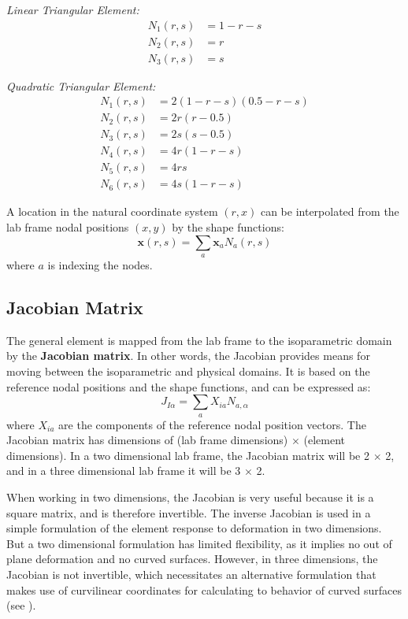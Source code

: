 \documentclass[]{spie}  %
\begin{document}
\textit{Linear Triangular Element:}
\begin{align}
\label{eq: linear element}
N_1(r,s) &=  1 - r - s \nonumber \\
N_2(r,s) &= r \nonumber \\
N_3(r,s) &= s
\end{align}

\textit{Quadratic Triangular Element:}
\begin{align}
\label{eq: linear element}
N_1(r,s) &= 2(1-r-s)(0.5-r-s) \nonumber \\
N_2(r,s) &= 2r(r-0.5) \nonumber \\
N_3(r,s) &= 2s(s-0.5) \nonumber \\
N_4(r,s) &= 4r(1-r-s) \nonumber \\
N_5(r,s) &= 4rs \nonumber \\
N_6(r,s) &= 4s(1-r-s) 
\end{align}

A location in the natural coordinate system $(r,x)$ can be interpolated from the lab frame nodal positions $(x,y)$ by the shape functions:
\begin{equation}
\label{eq: shape function mapping}
\bm{x}(r,s) = \sum\limits_{a} \bm{x}_a  N_a(r,s) 
\end{equation}
where $a$ is indexing the nodes. 

\subsection{Jacobian Matrix}
The general element is mapped from the lab frame to the isoparametric domain by the \textbf{Jacobian matrix}. In other words, the Jacobian provides means for moving between the isoparametric and physical domains. It is based on the reference nodal positions and the shape functions, and can be expressed as:
\begin{equation}
\label{eq: Jacobian matrix}
J_{I\alpha} = \sum\limits_{a} X_{ia} N_{a,\alpha}
\end{equation}
where $X_{ia}$ are the components of the reference nodal position vectors. The Jacobian matrix has dimensions of (lab frame dimensions) $\times$ (element dimensions). In a two dimensional lab frame, the Jacobian matrix will be 2 $\times$ 2, and in a three dimensional lab frame it will be 3 $\times$ 2. 

When working in two dimensions, the Jacobian is very useful because it is a square matrix, and is therefore invertible. The inverse Jacobian is used in a simple formulation of the element response to deformation in two dimensions. But a two dimensional formulation has limited flexibility, as it implies no out of plane deformation and no curved surfaces. However, in three dimensions, the Jacobian is not invertible, which necessitates an alternative formulation that makes use of curvilinear coordinates for calculating to behavior of curved surfaces (see \textit{}).
\end{document}
